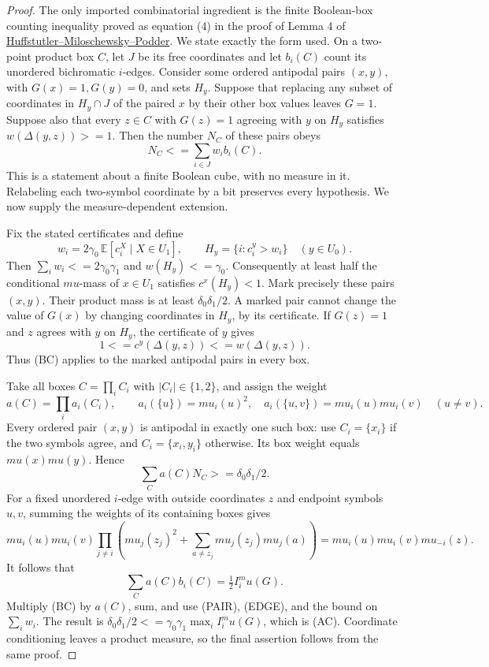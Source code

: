 \documentclass[11pt]{article}
\theoremstyle{definition}
\theoremstyle{remark}
\def\mu{mu}\def\rho{rho}\def\le{<=}\def\ge{>=}%
\begin{document}
\begin{proof}
The only imported combinatorial ingredient is the finite Boolean-box
counting inequality proved as equation (4) in the proof of Lemma 4 of
\href{https://arxiv.org/abs/2611.12795}
{Huffstutler--Miloschewsky--Podder}.
We state exactly the form used. On a two-point product box \(C\), let
\(J\) be its free coordinates and let \(b_i(C)\) count its
unordered bichromatic \(i\)-edges. Consider some ordered antipodal
pairs \((x,y)\), with \(G(x)=1,G(y)=0\), and sets \(H_y\).
Suppose that replacing any subset of coordinates in \(H_y\cap J\)
of the paired \(x\) by their other box values leaves \(G=1\).
Suppose also that every \(z\in C\) with \(G(z)=1\) agreeing with
\(y\) on \(H_y\) satisfies \(w(\Delta(y,z))\ge1\).
Then the number \(N_C\) of these pairs obeys
\[
 N_C\le\sum_{i\in J}w_i b_i(C).                 \tag{BC}
\]
This is a statement about a finite Boolean cube, with no measure in it.
Relabeling each two-symbol coordinate by a bit preserves every
hypothesis. We now supply the measure-dependent extension.

Fix the stated certificates and define
\[
 w_i=2\gamma_0\,\mathbb E[c_i^X\mid X\in U_1],
 \qquad H_y=\{i:c_i^y>w_i\}\quad(y\in U_0).
\]
Then \(\sum_iw_i\le2\gamma_0\gamma_1\) and
\(w(H_y)\le\gamma_0\). Consequently at least half the conditional
\(\mu\)-mass of \(x\in U_1\) satisfies \(c^x(H_y)<1\).
Mark precisely these pairs \((x,y)\). Their product mass is at least
\(\delta_0\delta_1/2\). A marked pair cannot change the value of
\(G(x)\) by changing coordinates in \(H_y\), by its certificate.
If \(G(z)=1\) and \(z\) agrees with \(y\) on \(H_y\), the
certificate of \(y\) gives
\[
 1\le c^y(\Delta(y,z))\le w(\Delta(y,z)).
\]
Thus (BC) applies to the marked antipodal pairs in every box.

Take all boxes \(C=\prod_i C_i\) with \(|C_i|\in\{1,2\}\),
and assign the weight
\[
 a(C)=\prod_i a_i(C_i),\qquad
 a_i(\{u\})=\mu_i(u)^2,
 \quad a_i(\{u,v\})=\mu_i(u)\mu_i(v)\quad(u\ne v).
\]
Every ordered pair \((x,y)\) is antipodal in exactly one such box:
use \(C_i=\{x_i\}\) if the two symbols agree, and
\(C_i=\{x_i,y_i\}\) otherwise. Its box weight equals
\(\mu(x)\mu(y)\). Hence
\[
 \sum_C a(C)N_C\ge\delta_0\delta_1/2.             \tag{PAIR}
\]
For a fixed unordered \(i\)-edge with outside coordinates \(z\)
and endpoint symbols \(u,v\), summing the weights of its containing
boxes gives
\[
 \mu_i(u)\mu_i(v)
 \prod_{j\ne i}\left(\mu_j(z_j)^2+
               \sum_{a\ne z_j}\mu_j(z_j)\mu_j(a)\right)
 =\mu_i(u)\mu_i(v)\mu_{-i}(z).
\]
It follows that
\[
 \sum_C a(C)b_i(C)=\tfrac12 I_i^\mu(G).            \tag{EDGE}
\]
Multiply (BC) by \(a(C)\), sum, and use (PAIR), (EDGE), and the
bound on \(\sum_iw_i\). The result is
\(\delta_0\delta_1/2\le\gamma_0\gamma_1\max_i I_i^\mu(G)\),
which is (AC). Coordinate conditioning leaves a product measure, so
the final assertion follows from the same proof.
\end{proof}
\end{document}

